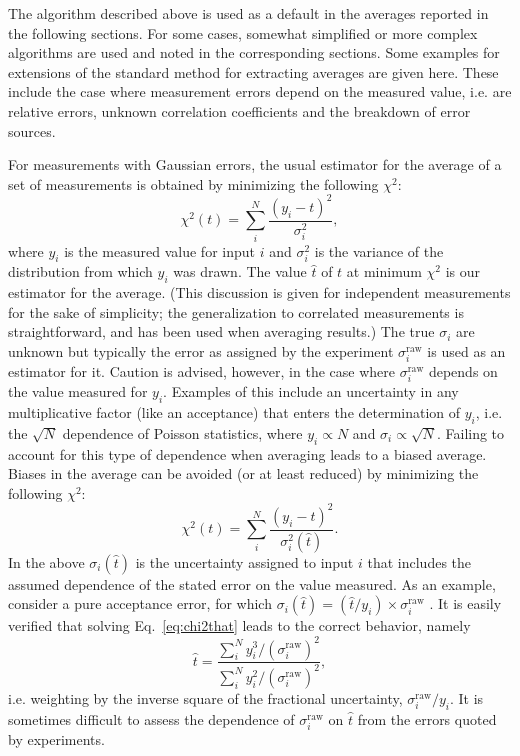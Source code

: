  The algorithm described above is used as a default in the averages
reported in the following sections.  For some cases, somewhat simplified
or more complex algorithms are used and noted in the corresponding 
sections. Some examples for extensions of the standard method for extracting
averages are given here. These include the case where measurement errors
depend on the measured value, i.e. are relative errors, unknown
correlation coefficients and the breakdown of error sources.

For measurements with Gaussian errors, the usual estimator for the
average of a set of measurements is obtained by minimizing the following
$\chi^2$:
\begin{equation}
\chi^2(t) = \sum_i^N \frac{\left(y_i-t\right)^2}{\sigma^2_i} ,
\label{eq:chi2t}
\end{equation}
where $y_i$ is the measured value for input $i$ and $\sigma_i^2$ is the
variance of the distribution from which $y_i$ was drawn.  The value $\hat{t}$
of $t$ at minimum $\chi^2$ is our estimator for the average.  (This
discussion is given for independent measurements for the sake of
simplicity; the generalization to correlated measurements is
straightforward, and has been used when averaging results.) 
The true $\sigma_i$ are unknown but typically the error as assigned by the
experiment $\sigma_i^{\mathrm{raw}}$ is used as an estimator for it.
Caution is advised,
however, in the case where $\sigma_i^{\mathrm{raw}}$
depends on the value measured for $y_i$. Examples of this include
an uncertainty in any multiplicative factor (like
an acceptance) that enters the determination of $y_i$, i.e. the $\sqrt{N}$
dependence of Poisson statistics, where $y_i \propto N$
and $\sigma_i \propto \sqrt{N}$.
Failing to account for this type of
dependence when averaging leads to a biased average.
Biases in the average can be avoided (or at least reduced)
by minimizing the following
$\chi^2$:
\begin{equation}
\chi^2(t) = \sum_i^N \frac{\left(y_i-t\right)^2}{\sigma^2_i(\hat{t})} .
\label{eq:chi2that}
\end{equation}
In the above $\sigma_i(\hat{t})$ is the uncertainty
assigned to input $i$ that includes the assumed dependence of the
stated error on the value measured.  As an example, consider 
a pure acceptance error, for which
$\sigma_i(\hat{t}) = (\hat{t} / y_i)\times\sigma_i^{\mathrm{raw}}$ .
It is easily verified that solving Eq.~\ref{eq:chi2that} 
leads to the correct behavior, namely
$$ 
\hat{t} = \frac{\sum_i^N y_i^3/(\sigma_i^{\mathrm{raw}})^2}{\sum_i^N y_i^2/(\sigma_i^{\mathrm{raw}})^2},
$$
i.e. weighting by the inverse square of the 
fractional uncertainty, $\sigma_i^{\mathrm{raw}}/y_i$.
It is sometimes difficult to assess the dependence of $\sigma_i^{\mathrm{raw}}$ on
$\hat{t}$ from the errors quoted by experiments.  


